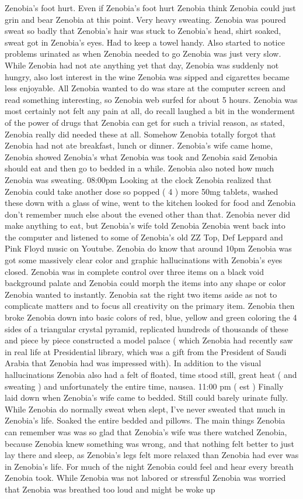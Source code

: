 \documentclass[12pt]{book}
\begin{document}
Zenobia's foot hurt. Even if Zenobia's foot hurt Zenobia think Zenobia could just grin and bear Zenobia at this point. Very heavy sweating. Zenobia was poured sweat so badly that Zenobia's hair was stuck to Zenobia's head, shirt soaked, sweat got in Zenobia's eyes. Had to keep a towel handy. Also started to notice problems urinated as when Zenobia needed to go Zenobia was just very slow. While Zenobia had not ate anything yet that day, Zenobia was suddenly not hungry, also lost interest in the wine Zenobia was sipped and cigarettes became less enjoyable. All Zenobia wanted to do was stare at the computer screen and read something interesting, so Zenobia web surfed for about 5 hours. Zenobia was most certainly not felt any pain at all, do recall laughed a bit in the wonderment of the power of drugs that Zenobia can get for such a trivial reason, as stated, Zenobia really did needed these at all. Somehow Zenobia totally forgot that Zenobia had not ate breakfast, lunch or dinner. Zenobia's wife came home, Zenobia showed Zenobia's what Zenobia was took and Zenobia said Zenobia should eat and then go to bedded in a while. Zenobia also noted how much Zenobia was sweating. 08:00pm Looking at the clock Zenobia realized that Zenobia could take another dose so popped ( 4 ) more 50mg tablets, washed these down with a glass of wine, went to the kitchen looked for food and Zenobia don't remember much else about the evened other than that. Zenobia never did make anything to eat, but Zenobia's wife told Zenobia Zenobia went back into the computer and listened to some of Zenobia's old ZZ Top, Def Leppard and Pink Floyd music on Youtube. Zenobia do know that around 10pm Zenobia was got some massively clear color and graphic hallucinations with Zenobia's eyes closed. Zenobia was in complete control over three items on a black void background palate and Zenobia could morph the items into any shape or color Zenobia wanted to instantly. Zenobia sat the right two items aside as not to complicate matters and to focus all creativity on the primary item. Zenobia then broke Zenobia down into basic colors of red, blue, yellow and green coloring the 4 sides of a triangular crystal pyramid, replicated hundreds of thousands of these and piece by piece constructed a model palace ( which Zenobia had recently saw in real life at Presidential library, which was a gift from the President of Saudi Arabia that Zenobia had was impressed with). In addition to the visual hallucinations Zenobia also had a felt of floated, time stood still, great heat ( and sweating ) and unfortunately the entire time, nausea. 11:00 pm ( est ) Finally laid down when Zenobia's wife came to bedded. Still could barely urinate fully. While Zenobia do normally sweat when slept, I've never sweated that much in Zenobia's life. Soaked the entire bedded and pillows. The main things Zenobia can remember was was so glad that Zenobia's wife was there watched Zenobia, because Zenobia knew something was wrong, and that nothing felt better to just lay there and sleep, as Zenobia's legs felt more relaxed than Zenobia had ever was in Zenobia's life. For much of the night Zenobia could feel and hear every breath Zenobia took. While Zenobia was not labored or stressful Zenobia was worried that Zenobia was breathed too loud and might be woke up 
\end{document}

